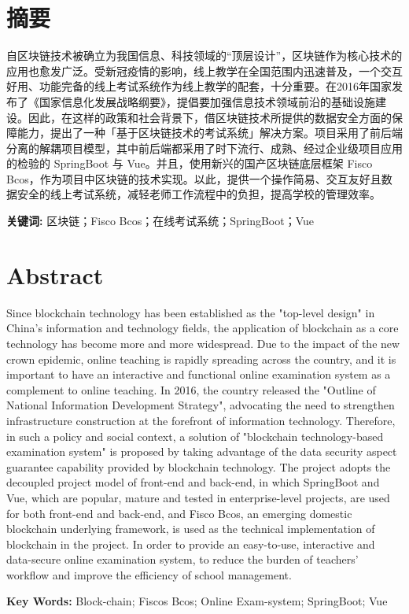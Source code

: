 \section*{\centering 摘要}
\vskip0.5cm
自区块链技术被确立为我国信息、科技领域的“顶层设计”，区块链作为核心技术的应用也愈发广泛。受新冠疫情的影响，线上教学在全国范围内迅速普及，一个交互好用、功能完备的线上考试系统作为线上教学的配套，十分重要。在2016年国家发布了《国家信息化发展战略纲要》，提倡要加强信息技术领域前沿的基础设施建设。因此，在这样的政策和社会背景下，借区块链技术所提供的数据安全方面的保障能力，提出了一种「基于区块链技术的考试系统」解决方案。项目采用了前后端分离的解耦项目模型，其中前后端都采用了时下流行、成熟、经过企业级项目应用的检验的 SpringBoot 与 Vue。并且，使用新兴的国产区块链底层框架 Fisco Bcos，作为项目中区块链的技术实现。以此，提供一个操作简易、交互友好且数据安全的线上考试系统，减轻老师工作流程中的负担，提高学校的管理效率。

\textbf{关键词:} 区块链；Fisco Bcos；在线考试系统；SpringBoot；Vue

\clearpage  %

\section*{\centering \textbf{Abstract}}
\vskip0.5cm
Since blockchain technology has been established as the "top-level design" in China's information and technology fields, the application of blockchain as a core technology has become more and more widespread. Due to the impact of the new crown epidemic, online teaching is rapidly spreading across the country, and it is important to have an interactive and functional online examination system as a complement to online teaching. In 2016, the country released the "Outline of National Information Development Strategy", advocating the need to strengthen infrastructure construction at the forefront of information technology. Therefore, in such a policy and social context, a solution of "blockchain technology-based examination system" is proposed by taking advantage of the data security aspect guarantee capability provided by blockchain technology. The project adopts the decoupled project model of front-end and back-end, in which SpringBoot and Vue, which are popular, mature and tested in enterprise-level projects, are used for both front-end and back-end, and Fisco Bcos, an emerging domestic blockchain underlying framework, is used as the technical implementation of blockchain in the project. In order to provide an easy-to-use, interactive and data-secure online examination system, to reduce the burden of teachers' workflow and improve the efficiency of school management.

\textbf{Key Words:} Block-chain; Fiscos Bcos; Online Exam-system; SpringBoot; Vue
